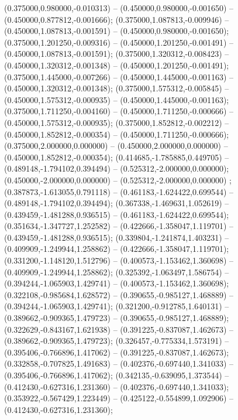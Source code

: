  (0.375000,0.980000,-0.010313) -- (0.450000,0.980000,-0.001650) -- (0.450000,0.877812,-0.001666);
 (0.375000,1.087813,-0.009946) -- (0.450000,1.087813,-0.001591) -- (0.450000,0.980000,-0.001650);
 (0.375000,1.201250,-0.009316) -- (0.450000,1.201250,-0.001491) -- (0.450000,1.087813,-0.001591);
 (0.375000,1.320312,-0.008423) -- (0.450000,1.320312,-0.001348) -- (0.450000,1.201250,-0.001491);
 (0.375000,1.445000,-0.007266) -- (0.450000,1.445000,-0.001163) -- (0.450000,1.320312,-0.001348);
 (0.375000,1.575312,-0.005845) -- (0.450000,1.575312,-0.000935) -- (0.450000,1.445000,-0.001163);
 (0.375000,1.711250,-0.004160) -- (0.450000,1.711250,-0.000666) -- (0.450000,1.575312,-0.000935);
 (0.375000,1.852812,-0.002212) -- (0.450000,1.852812,-0.000354) -- (0.450000,1.711250,-0.000666);
 (0.375000,2.000000,0.000000) -- (0.450000,2.000000,0.000000) -- (0.450000,1.852812,-0.000354);
 (0.414685,-1.785885,0.449705) -- (0.489148,-1.794102,0.394494) -- (0.525312,-2.000000,0.000000);
 (0.450000,-2.000000,0.000000) -- (0.525312,-2.000000,0.000000) ;
 (0.387873,-1.613055,0.791118) -- (0.461183,-1.624422,0.699544) -- (0.489148,-1.794102,0.394494);
 (0.367338,-1.469631,1.052619) -- (0.439459,-1.481288,0.936515) -- (0.461183,-1.624422,0.699544);
 (0.351634,-1.347727,1.252582) -- (0.422666,-1.358047,1.119701) -- (0.439459,-1.481288,0.936515);
 (0.339804,-1.241874,1.403231) -- (0.409909,-1.249944,1.258862) -- (0.422666,-1.358047,1.119701);
 (0.331200,-1.148120,1.512796) -- (0.400573,-1.153462,1.360698) -- (0.409909,-1.249944,1.258862);
 (0.325392,-1.063497,1.586754) -- (0.394244,-1.065903,1.429741) -- (0.400573,-1.153462,1.360698);
 (0.322108,-0.985684,1.628572) -- (0.390655,-0.985127,1.468889) -- (0.394244,-1.065903,1.429741);
 (0.321200,-0.912785,1.640131) -- (0.389662,-0.909365,1.479723) -- (0.390655,-0.985127,1.468889);
 (0.322629,-0.843167,1.621938) -- (0.391225,-0.837087,1.462673) -- (0.389662,-0.909365,1.479723);
 (0.326457,-0.775334,1.573191) -- (0.395406,-0.766896,1.417062) -- (0.391225,-0.837087,1.462673);
 (0.332858,-0.707825,1.491683) -- (0.402376,-0.697440,1.341033) -- (0.395406,-0.766896,1.417062);
 (0.342135,-0.639095,1.373544) -- (0.412430,-0.627316,1.231360) -- (0.402376,-0.697440,1.341033);
 (0.353922,-0.567429,1.223449) -- (0.425122,-0.554899,1.092906) -- (0.412430,-0.627316,1.231360);
